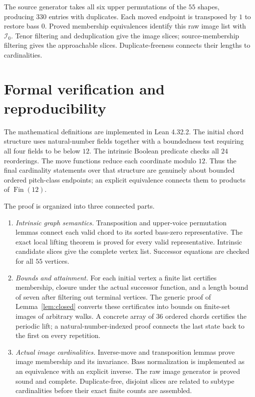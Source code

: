 \documentclass[11pt,letterpaper]{article}
\theoremstyle{definition}\newtheorem{definition}[theorem]{Definition}
\newcommand{\I}{\mathcal I}
\begin{document}
The source generator takes all six upper permutations of the $55$ shapes, producing $330$ entries with duplicates. Each moved endpoint is transposed by $1$ to restore bass $0$. Proved membership equivalences identify this raw image list with $\I_0$. Tenor filtering and deduplication give the image slices; source-membership filtering gives the approachable slices. Duplicate-freeness connects their lengths to cardinalities.

\clearpage
\section{Formal verification and reproducibility}
The mathematical definitions are implemented in Lean 4.32.2. The initial chord structure uses natural-number fields together with a boundedness test requiring all four fields to be below $12$. The intrinsic Boolean predicate checks all $24$ reorderings. The move functions reduce each coordinate modulo $12$. Thus the final cardinality statements over that structure are genuinely about bounded ordered pitch-class endpoints; an explicit equivalence connects them to products of $\operatorname{Fin}(12)$.

The proof is organized into three connected parts.
\begin{enumerate}[label=\arabic*.]
\item \emph{Intrinsic graph semantics.} Transposition and upper-voice permutation lemmas connect each valid chord to its sorted bass-zero representative. The exact local lifting theorem is proved for every valid representative. Intrinsic candidate slices give the complete vertex list. Successor equations are checked for all $55$ vertices.
\item \emph{Bounds and attainment.} For each initial vertex a finite list certifies membership, closure under the actual successor function, and a length bound of seven after filtering out terminal vertices. The generic proof of Lemma~\ref{lem:closed} converts these certificates into bounds on finite-set images of arbitrary walks. A concrete array of $36$ ordered chords certifies the periodic lift; a natural-number-indexed proof connects the last state back to the first on every repetition.
\item \emph{Actual image cardinalities.} Inverse-move and transposition lemmas prove image membership and its invariance. Bass normalization is implemented as an equivalence with an explicit inverse. The raw image generator is proved sound and complete. Duplicate-free, disjoint slices are related to subtype cardinalities before their exact finite counts are assembled.
\end{enumerate}
\end{document}
